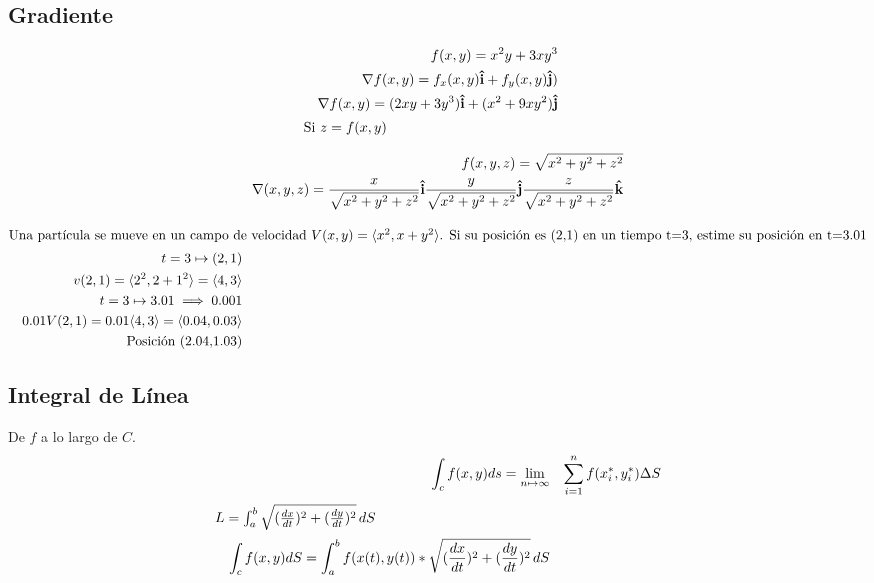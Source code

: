 \subsection{Gradiente}
\begin{definition}
\begin{align}
    && f(x,y)=x^2 y+3xy^3 &&\\
    && \nabla f(x,y)=f_x(x,y)\boldsymbol{\hat{\textbf{i}}}+f_y(x,y)\boldsymbol{\hat{\textbf{j}}}) &&\\
    && \nabla f(x,y)=(2xy+3y^3)\boldsymbol{\hat{\textbf{i}}}+(x^2 +9xy^2)\boldsymbol{\hat{\textbf{j}}} &&\\
    \intertext{Si $z=f(x,y)$}
\end{align}
\end{definition}

\begin{exercise}
\begin{align}
    && f(x,y,z)=\sqrt{x^2+y^2+z^2} &&\\
    && \nabla(x,y,z)=\frac{x}{\sqrt{x^2 +y^2+z^2}}\boldsymbol{\hat{\textbf{i}}}\frac{y}{\sqrt{x^2 +y^2+z^2}}\boldsymbol{\hat{\textbf{j}}}\frac{z}{\sqrt{x^2 +y^2+z^2}}\boldsymbol{\hat{\textbf{k}}} &&\\
\end{align}
\end{exercise}

\begin{exercise}
\begin{align}
    \intertext{Una partícula se mueve en un campo de velocidad $V(x,y)= \langle x^2,x+y^2 \rangle$. Si su posición es (2,1) en un tiempo t=3, estime su posición en t=3.01}
    && t=3\mapsto(2,1) &&\\
    && v(2,1)=\langle 2^2,2+1^2 \rangle=\langle 4,3 \rangle &&\\
    && t=3\mapsto3.01\implies0.001 &&\\
    && 0.01V(2,1)=0.01\langle 4,3 \rangle=\langle 0.04,0.03 \rangle &&\\
    && \text{Posición (2.04,1.03)} &&
\end{align}
\end{exercise}
\subsection{Integral de Línea}
\begin{definition}
De $f$ a lo largo de $C$. 
\begin{align}
    && \int_c f(x,y)ds = \lim_{n\mapsto\infty} &&\sum_{i=1}^{n}{f(x_i^*,y_i^*)\Delta S}\\
    \intertext{$L=\int_{a}^{b} \sqrt{(\frac{dx}{dt})^2+(\frac{dy}{dt})^2} \, d{S}$}
    && \int_c f(x,y)dS=\int_{a}^{b} f(x(t),y(t))*\sqrt{(\frac{dx}{dt})^2+(\frac{dy}{dt})^2} \, d{S} &&
\end{align}
\end{definition}

